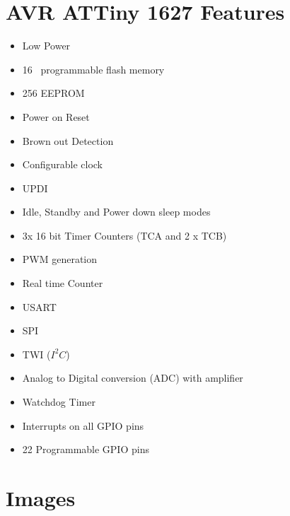 \documentclass[11pt,a4paper,titlepage]{report}
\begin{document}
	\section{AVR ATTiny 1627 Features}\label{appendix:attiny_features}
	\begin{itemize}
		\item Low Power
		\item 16\unit{\kilo\byte} programmable flash memory
		\item 256\unit{\byte} EEPROM
		\item Power on Reset
		\item Brown out Detection
		\item Configurable clock
		\item UPDI
		\item Idle, Standby and Power down sleep modes
		\item 3x 16 bit Timer Counters (TCA and 2 x TCB)
		\item PWM generation
		\item Real time Counter
		\item USART
		\item SPI
		\item TWI ($I^{2}C$)
		\item Analog to Digital conversion (ADC) with amplifier
		\item Watchdog Timer
		\item Interrupts on all GPIO pins
		\item 22 Programmable GPIO pins
	\end{itemize}
	
	\section{Images}\label{appendix:images}
\end{document}
